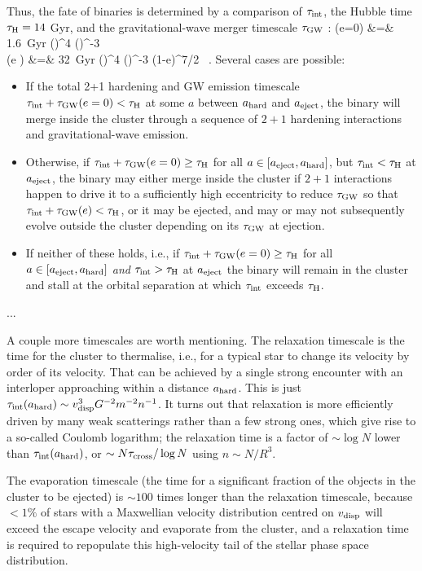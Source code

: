 \documentclass[amsmath,onecolumn]{aastex}
\begin{document}
Thus, the fate of binaries is determined by a comparison of $\tau_\textrm{int}$, the Hubble time $\tau_\textrm{H}=14$ Gyr, and the gravitational-wave merger timescale $\tau_\textrm{GW}$ \citep{Peters:1964}:
\ba
\tGW (e=0) &=& 1.6\ \textrm{Gyr} \left(\right)^4 \left(\right)^{-3}\\
\tGW (e ) &=& 32\ \textrm{Gyr} \left(\right)^4 \left(\right)^{-3} (1-e)^{7/2} \ . \nonumber
\ea
Several cases are possible:
\begin{itemize}
\item If the total 2+1 hardening and GW emission timescale $\tau_\textrm{int}+\tau_\textrm{GW} (e=0) < \tau_\textrm{H} $ at some $a$ between $a_\textrm{hard}$ and $a_\textrm{eject}$, the binary will merge inside the cluster through a sequence of $2+1$ hardening interactions and gravitational-wave emission.  
\item Otherwise, if $\tau_\textrm{int}+\tau_\textrm{GW} (e=0) \geq \tau_\textrm{H} $ for all $a \in [a_\textrm{eject}, a_\textrm{hard}]$, but $\tau_\textrm{int}<\tau_\textrm{H}$ at $a_\textrm{eject}$, the binary may either merge inside the cluster if $2+1$ interactions happen to drive it to a sufficiently high eccentricity to reduce $\tau_\textrm{GW}$ so that $\tau_\textrm{int}+\tau_\textrm{GW} (e) < \tau_\textrm{H}$, or it may be ejected, and may or may not subsequently evolve outside the cluster depending on its $\tau_\textrm{GW}$ at ejection.  
\item If neither of these holds, i.e.,  if $\tau_\textrm{int}+\tau_\textrm{GW} (e=0) \geq \tau_\textrm{H} $ for all $a \in [a_\textrm{eject}, a_\textrm{hard}]$ {\it and} $\tau_\textrm{int} > \tau_\textrm{H}$ at $a_\textrm{eject}$ the binary will remain in the cluster and stall at the orbital separation at which $\tau_\textrm{int}$ exceeds $\tau_\textrm{H}$.    
\end{itemize}

...

A couple more timescales are worth mentioning.  The relaxation timescale is the time for the cluster to thermalise, i.e., for a typical star to change its velocity by order of its velocity.  That can be achieved by a single strong encounter with an interloper approaching within a distance $a_\textrm{hard}$.  This is just $\tau_\textrm{int} (a_\textrm{hard}) \sim v_\textrm{disp}^3 G^{-2} m^{-2} n^{-1}$.  It turns out that relaxation is more efficiently driven by many weak scatterings rather than a few strong ones, which give rise to a so-called Coulomb logarithm; the relaxation time is a factor of $\sim \log N$ lower than $\tau_\textrm{int} (a_\textrm{hard})$, or $\sim N \tau_\textrm{cross} / \log N$ using $n \sim N/R^3$.   

The evaporation timescale (the time for a significant fraction of the objects in the cluster to be ejected) is $\sim 100$ times longer than the relaxation timescale, because $< 1\%$ of stars with a Maxwellian velocity distribution centred on $v_\textrm{disp}$ will exceed the escape velocity and evaporate from the cluster, and a relaxation time is required to repopulate this high-velocity tail of the stellar phase space distribution. 





\end{document}
